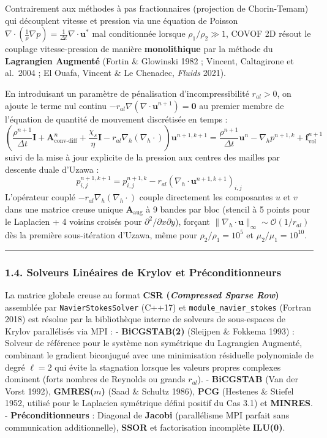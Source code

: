 \documentclass[
  10pt,
]{article}
\begin{document}
Contrairement aux méthodes à pas fractionnaires (projection de
Chorin-Temam) qui découplent vitesse et pression via une équation de
Poisson
\(\nabla \cdot (\frac{1}{\rho}\nabla p) = \frac{1}{\Delta t}\nabla \cdot \mathbf{u}^*\)
mal conditionnée lorsque \(\rho_1 / \rho_2 \gg 1\), COVOF 2D résout le
couplage vitesse-pression de manière \textbf{monolithique} par la
méthode du \textbf{Lagrangien Augmenté} (Fortin \& Glowinski 1982 ;
Vincent, Caltagirone et al.~2004 ; El Ouafa, Vincent \& Le Chenadec,
\emph{Fluids} 2021).

En introduisant un paramètre de pénalisation d'incompressibilité
\(r_{al} > 0\), on ajoute le terme nul continu
\(-r_{al} \nabla(\nabla \cdot \mathbf{u}^{n+1}) = \mathbf{0}\) au
premier membre de l'équation de quantité de mouvement discrétisée en
temps :
\[\left( \frac{\rho^{n+1}}{\Delta t} \mathbf{I} + \mathbf{A}_{\text{conv-diff}}^n + \frac{\chi_s}{\eta}\mathbf{I} - r_{al} \nabla_h (\nabla_h \cdot) \right) \mathbf{u}^{n+1, k+1} = \frac{\rho^{n+1}}{\Delta t} \mathbf{u}^n - \nabla_h p^{n+1, k} + \mathbf{f}_{\text{vol}}^{n+1}\]
suivi de la mise à jour explicite de la pression aux centres des mailles
par descente duale d'Uzawa :
\[p_{i,j}^{n+1, k+1} = p_{i,j}^{n+1, k} - r_{al} (\nabla_h \cdot \mathbf{u}^{n+1, k+1})_{i,j}\]
L'opérateur couplé \(-r_{al} \nabla_h (\nabla_h \cdot)\) couple
directement les composantes \(u\) et \(v\) dans une matrice creuse
unique \(\mathbf{A}_{\text{aug}}\) à 9 bandes par bloc (stencil à 5
points pour le Laplacien + 4 voisins croisés pour
\(\partial^2 / \partial x \partial y\)), forçant
\(\|\nabla_h \cdot \mathbf{u}\|_\infty \sim \mathcal{O}(1/r_{al})\) dès
la première sous-itération d'Uzawa, même pour \(\rho_2 / \rho_1 = 10^5\)
et \(\mu_2 / \mu_1 = 10^{10}\).

\begin{center}\rule{0.5\linewidth}{0.5pt}\end{center}

\subsubsection{1.4. Solveurs Linéaires de Krylov et
Préconditionneurs}\label{solveurs-linuxe9aires-de-krylov-et-pruxe9conditionneurs}

La matrice globale creuse au format \textbf{CSR (\emph{Compressed Sparse
Row})} assemblée par \texttt{NavierStokesSolver} (C++17) et
\texttt{module\_navier\_stokes} (Fortran 2018) est résolue par la
bibliothèque interne de solveurs de sous-espaces de Krylov parallélisés
via MPI : - \textbf{BiCGSTAB(2)} (Sleijpen \& Fokkema 1993) : Solveur de
référence pour le système non symétrique du Lagrangien Augmenté,
combinant le gradient biconjugué avec une minimisation résiduelle
polynomiale de degré \(\ell = 2\) qui évite la stagnation lorsque les
valeurs propres complexes dominent (forts nombres de Reynolds ou grands
\(r_{al}\)). - \textbf{BiCGSTAB} (Van der Vorst 1992),
\textbf{GMRES(\(m\))} (Saad \& Schultz 1986), \textbf{PCG} (Hestenes \&
Stiefel 1952, utilisé pour le Laplacien symétrique défini positif du Cas
3.1) et \textbf{MINRES}. - \textbf{Préconditionneurs} : Diagonal de
\textbf{Jacobi} (parallélisme MPI parfait sans communication
additionnelle), \textbf{SSOR} et factorisation incomplète
\textbf{ILU(0)}.
\end{document}
